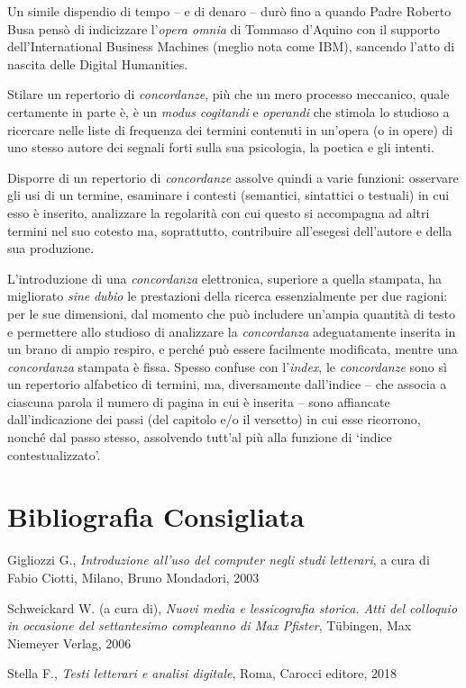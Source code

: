 Un simile dispendio di tempo -- e di denaro -- durò fino a quando Padre
Roberto Busa pensò di indicizzare l'\emph{opera omnia} di Tommaso
d'Aquino con il supporto dell'International Business Machines (meglio
nota come IBM), sancendo l'atto di nascita delle Digital Humanities.

Stilare un repertorio di \emph{concordanze}, più che un mero processo
meccanico, quale certamente in parte è, è un \emph{modus}
\emph{cogitandi} e \emph{operandi} che stimola lo studioso a ricercare
nelle liste di frequenza dei termini contenuti in un'opera (o in opere)
di uno stesso autore dei segnali forti sulla sua psicologia, la poetica
e gli intenti.

Disporre di un repertorio di \emph{concordanze} assolve quindi a varie
funzioni: osservare gli usi di un termine, esaminare i contesti
(semantici, sintattici o testuali) in cui esso è inserito, analizzare la
regolarità con cui questo si accompagna ad altri termini nel suo cotesto
ma, soprattutto, contribuire all'esegesi dell'autore e della sua
produzione.

L'introduzione di una \emph{concordanza} elettronica, superiore a quella
stampata, ha migliorato \emph{sine} \emph{dubio} le prestazioni della
ricerca essenzialmente per due ragioni: per le sue dimensioni, dal
momento che può includere un'ampia quantità di testo e permettere allo
studioso di analizzare la \emph{concordanza} adeguatamente inserita in
un brano di ampio respiro, e perché può essere facilmente modificata,
mentre una \emph{concordanza} stampata è fissa. Spesso confuse con
l'\emph{index}, le \emph{concordanze} sono sì un repertorio alfabetico
di termini, ma, diversamente dall'indice -- che associa a ciascuna
parola il numero di pagina in cui è inserita -- sono affiancate
dall'indicazione dei passi (del capitolo e/o il versetto) in cui esse
ricorrono, nonché dal passo stesso, assolvendo tutt'al più alla funzione
di `indice contestualizzato'.

\section*{Bibliografia Consigliata}
{\parindent0pt 
Gigliozzi G., \emph{Introduzione all'uso del computer negli studi
letterari}, a cura di Fabio Ciotti, Milano, Bruno Mondadori, 2003

Schweickard W. (a cura di), \emph{Nuovi media e lessicografia storica.
Atti del colloquio in occasione del settantesimo compleanno di Max
Pfister}, Tübingen, Max Niemeyer Verlag, 2006

Stella F., \emph{Testi letterari e analisi digitale}, Roma, Carocci
editore, 2018
}
